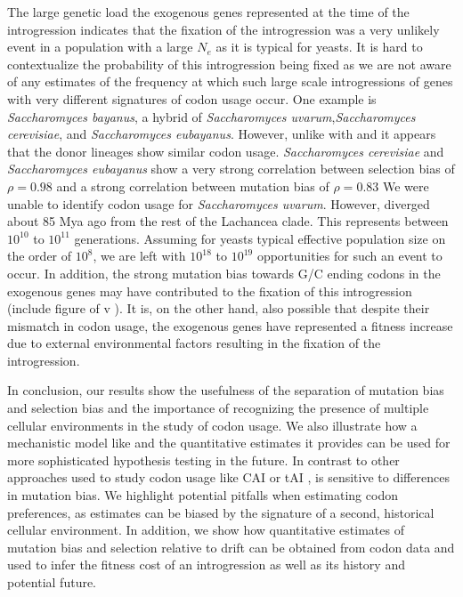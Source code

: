 \documentclass[12pt]{article}
\begin{document}
The large genetic load the exogenous genes represented at the time of the introgression indicates that the fixation of the introgression was a very unlikely event in a population with a large $N_e$ as it is typical for yeasts.
It is hard to contextualize the probability of this introgression being fixed as we are not aware of any estimates of the frequency at which such large scale introgressions of genes with very different signatures of codon usage occur.
One example is \emph{Saccharomyces bayanus}, a hybrid of \emph{Saccharomyces uvarum},\emph{Saccharomyces cerevisiae}, and \emph{Saccharomyces eubayanus}.
However, unlike with \kluyveri and \gossypii it appears that the donor lineages show similar codon usage.
\emph{Saccharomyces cerevisiae} and \emph{Saccharomyces eubayanus} show a very strong correlation between selection bias \DE of $\rho = 0.98$ and a strong correlation between mutation bias \DM of $ \rho = 0.83$
We were unable to identify codon usage for \emph{Saccharomyces uvarum}.
However, \kluyveri diverged about 85 Mya ago from the rest of the Lachancea clade.
This represents between $10^{10}$ to $10^{11}$ generations.
Assuming for yeasts typical effective population size on the order of $10^8$, we are left with $10^{18}$ to $10^{19}$ opportunities for such an event to occur.
In addition, the strong mutation bias towards G/C ending codons in the exogenous genes may have contributed to the fixation of this introgression (include figure of \DM v \DE).
It is, on the other hand, also possible that despite their mismatch in codon usage, the exogenous genes have represented a fitness increase due to external environmental factors resulting in the fixation of the introgression.
 
In conclusion, our results show the usefulness of the separation of mutation bias and selection bias and the importance of recognizing the presence of multiple cellular environments in the study of codon usage.
We also illustrate how a mechanistic model like \ROC and the quantitative estimates it provides can be used for more sophisticated hypothesis testing in the future.
In contrast to other approaches used to study codon usage like CAI \citep{sharp1987} or tAI \citep{dosreis2004}, \ROC is sensitive to differences in mutation bias.
We highlight potential pitfalls when estimating codon preferences, as estimates can be biased by the signature of a second, historical cellular environment.
In addition, we show how quantitative estimates of mutation bias and selection relative to drift can be obtained from codon data and used to infer the fitness cost of an introgression as well as its history and potential future.
\end{document}
